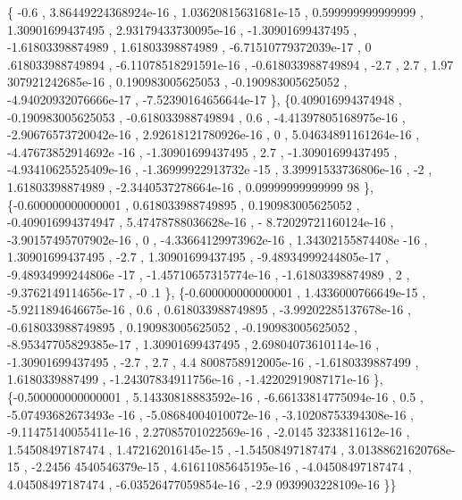 \begin{DoxyCode}
\{             -0.6 , 3.86449224368924e-16 , 1.03620815631681e-15 , 0.599999999999999 ,  1.30901699437495 , 
      2.93179433730095e-16 , -1.30901699437495 , -1.61803398874989 ,  1.61803398874989 , -6.71510779372039e-17 , 0
      .618033988749894 , -6.11078518291591e-16 , -0.618033988749894 ,              -2.7 ,               2.7 , 1.97
      307921242685e-16 , 0.190983005625053 , -0.190983005625052 , -4.94020932076666e-17 , -7.52390164656644e-17 \},
\{0.409016994374948 , -0.190983005625053 , -0.618033988749894 ,               0.6 , -4.41397805168975e-16 , 
      -2.90676573720042e-16 , 2.92618121780926e-16 ,                 0 , 5.04634891161264e-16 , -4.47673852914692e
      -16 , -1.30901699437495 ,               2.7 , -1.30901699437495 , -4.93410625525409e-16 , -1.36999922913732e
      -15 , 3.39991533736806e-16 ,                -2 ,  1.61803398874989 , -2.3440537278664e-16 , 0.09999999999999
      98 \},
\{-0.600000000000001 , 0.618033988749895 , 0.190983005625052 , -0.409016994374947 , 5.47478788036628e-16 , -
      8.72029721160124e-16 , -3.90157495707902e-16 ,                 0 , -4.33664129973962e-16 , 1.34302155874408e
      -16 ,  1.30901699437495 ,              -2.7 ,  1.30901699437495 , -9.48934999244805e-17 , -9.48934999244806e
      -17 , -1.45710657315774e-16 , -1.61803398874989 ,                 2 , -9.3762149114656e-17 ,              -0
      .1 \},
\{-0.600000000000001 , 1.4336000766649e-15 , -5.9211894646675e-16 ,               0.6 , 0.618033988749895 , 
      -3.99202285137678e-16 , -0.618033988749895 , 0.190983005625052 , -0.190983005625052 , -8.95347705829385e-17 
      ,  1.30901699437495 , 2.69804073610114e-16 , -1.30901699437495 ,              -2.7 ,               2.7 , 4.4
      8008758912005e-16 ,  -1.6180339887499 ,   1.6180339887499 , -1.24307834911756e-16 , -1.42202919087171e-16 \},
\{-0.500000000000001 , 5.14330818883592e-16 , -6.66133814775094e-16 ,               0.5 , -5.07493682673493e
      -16 , -5.08684004010072e-16 , -3.10208753394308e-16 , -9.11475140055411e-16 , 2.27085701022569e-16 , -2.0145
      3233811612e-16 ,  1.54508497187474 , 1.472162016145e-15 , -1.54508497187474 , 3.01388621620768e-15 , -2.2456
      4540546379e-15 , 4.61611085645195e-16 , -4.04508497187474 ,  4.04508497187474 , -6.03526477059854e-16 , -2.9
      0939903228109e-16 \}\}
\end{DoxyCode}
\mbox{\label{a00485_a1e47c16b2e6ee717c5562d1d404ad52e}} 
